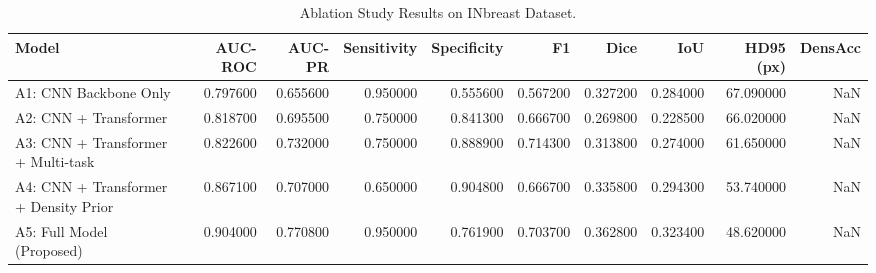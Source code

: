 \begin{table}
\caption{Ablation Study Results on INbreast Dataset.}
\label{tab:ablation}
\begin{tabular}{lrrrrrrrrr}
\toprule
Model & AUC-ROC & AUC-PR & Sensitivity & Specificity & F1 & Dice & IoU & HD95 (px) & DensAcc \\
\midrule
A1: CNN Backbone Only & 0.797600 & 0.655600 & 0.950000 & 0.555600 & 0.567200 & 0.327200 & 0.284000 & 67.090000 & NaN \\
A2: CNN + Transformer & 0.818700 & 0.695500 & 0.750000 & 0.841300 & 0.666700 & 0.269800 & 0.228500 & 66.020000 & NaN \\
A3: CNN + Transformer + Multi-task & 0.822600 & 0.732000 & 0.750000 & 0.888900 & 0.714300 & 0.313800 & 0.274000 & 61.650000 & NaN \\
A4: CNN + Transformer + Density Prior & 0.867100 & 0.707000 & 0.650000 & 0.904800 & 0.666700 & 0.335800 & 0.294300 & 53.740000 & NaN \\
A5: Full Model (Proposed) & 0.904000 & 0.770800 & 0.950000 & 0.761900 & 0.703700 & 0.362800 & 0.323400 & 48.620000 & NaN \\
\bottomrule
\end{tabular}
\end{table}
